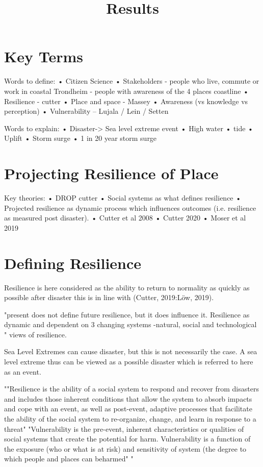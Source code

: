 \documentclass{article}
\begin{document}
\title{Results}
\section{Key Terms}
Words to define: 
•	Citizen Science \cite{tweddle_guide_2012}
•	Stakeholders - people who live, commute or work in coastal Trondheim - people with awareness of the 4 places coastline
•	Resilience - cutter
•	Place and space - Massey
•	Awareness (vs knowledge vs perception)
•	Vulnerability – Lujala / Lein / Setten 

Words to explain:
•	Disaster-> Sea level extreme event
•	High water
•	tide
•	Uplift
•	Storm surge
•	1 in 20 year storm surge

\section{Projecting Resilience of Place}
Key theories:
•	DROP cutter
•	Social systems as what defines resilience
•	Projected resilience as dynamic process which influences outcomes (i.e. resilience as measured post disaster). 
•	Cutter et al 2008
•	Cutter 2020 
•	Moser et al 2019 

\section{Defining Resilience} 
Resilience is here considered as the ability to return to normality as quickly as possible after disaster this is in line with (Cutter, 2019:Löw, 2019).

"present does not define future resilience, but it does influence it. Resilience as dynamic and dependent on 3 changing systems -natural, social and technological
" \cite{cutter_community_2020} views of resilience.

Sea Level Extremes can cause disaster, but this is not necessarily the case. A sea level extreme thus can be viewed as a possible disaster which is referred to here as an event. 

""Resilience is the ability of a social system to respond and recover from disasters and includes those inherent conditions that allow the system to absorb impacts and cope with an event, as well as post-event, adaptive processes that facilitate the ability of the social system to re-organize, change, and learn in response to a threat" "Vulnerability is the pre-event, inherent characteristics or qualities of social systems that create the potential for harm. Vulnerability is a function of the exposure (who or what is at risk) and sensitivity of system (the degree to which people and places can beharmed" " \cite{cutter_place-based_2008}
\end{document}
